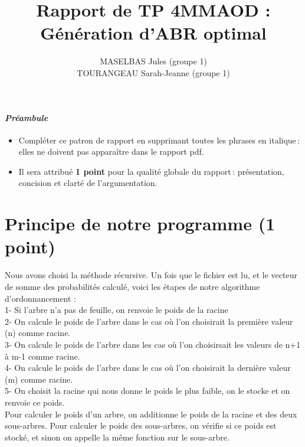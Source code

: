 \documentclass[a4paper, 10pt, french]{article}
\title{Rapport de TP 4MMAOD : Génération d'ABR optimal}
\author{
MASELBAS Jules (groupe 1) 
\\ TOURANGEAU Sarah-Jeanne (groupe 1) 
}
\begin{document}
\maketitle

\paragraph{\em Préambule}
{\em \begin{itemize} 
   \item Compléter ce patron de rapport en supprimant toutes les phrases en italique\,: elles ne doivent pas apparaître dans le rapport pdf.
   \item Il sera attribué {\bf 1 point} pour la qualité globale du rapport\,: présentation, concision et clarté de l'argumentation.
\end{itemize}
}

\section{Principe de notre  programme (1 point)}

Nous avons choisi la méthode récursive. Un fois que le fichier est lu, et le vecteur de somme des probabilités calculé, voici les étapes de notre algorithme d'ordonnancement : \\
1- Si l'arbre n'a pas de feuille, on renvoie le poids de la racine\\
2- On calcule le poids de l'arbre dans le cas où l'on choisirait la première valeur (n) comme racine.\\
3- On calcule le poids de l'arbre dans les cas où l'on choisirsait les valeurs de n+1 à m-1 comme racine.\\
4- On calcule le poids de l'arbre dans le cas où l'on choisirait la dernière valeur (m) comme racine.\\
5- On choisit la racine qui nous donne le poids le plus faible, on le stocke et on renvoie ce poids.\\
 
Pour calculer le poids d'un arbre, on additionne le poids de la racine et des deux sous-arbres. Pour calculer le poids des sous-arbres, on vérifie si ce poids est stocké, et sinon on appelle la même fonction sur le sous-arbre.\\
\end{document}

